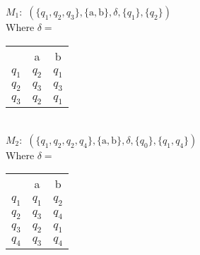 $M_1:$ $(\{q_1, q_2, q_3\}, \{\text{a},\text{b}\}, \delta, \{q_1\}, \{q_2\})$ \\ 
	\indent Where $\delta=$ \begin{tabular}{|ccc|}
				&	a		&	b		\\
		$q_1$	&	$q_2$	&	$q_1$	\\
		$q_2$	&	$q_3$	&	$q_3$	\\
		$q_3$	&	$q_2$	&	$q_1$	\\
	\end{tabular} \\[15pt]
$M_2:$ $(\{q_1, q_2, q_2, q_4\}, \{\text{a}, \text{b}\}, \delta, \{q_0\}, \{q_1, q_4\})$ \\ 
	\indent Where $\delta=$ \begin{tabular}{|ccc|}
				&	a		&	b		\\
		$q_1$	&	$q_1$	&	$q_2$	\\
		$q_2$	&	$q_3$	&	$q_4$	\\
		$q_3$	&	$q_2$	&	$q_1$	\\
		$q_4$	&	$q_3$	&	$q_4$	\\
	\end{tabular} \\